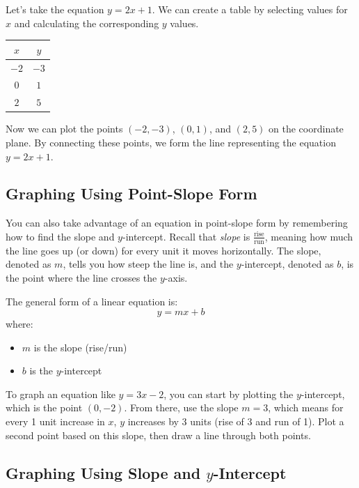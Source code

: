 \documentclass[12pt]{article}
\begin{document}
Let's take the equation \( y = 2x + 1 \). We can create a table by selecting
values for $x$ and calculating the corresponding $y$ values.

\begin{center}
  \begin{tabular}{cc}
    \hline
    $x$  & $y$  \\
    \hline
    $-2$ & $-3$ \\
    $0$  & $1$  \\
    $2$  & $5$  \\
    \hline
  \end{tabular}
\end{center}

Now we can plot the points $(-2, -3)$, $(0, 1)$, and $(2, 5)$ on the coordinate
plane. By connecting these points, we form the line representing the equation \(
y = 2x + 1 \).

\subsection{Graphing Using Point-Slope Form}

You can also take advantage of an equation in point-slope form by remembering
how to find the slope and $y$-intercept. Recall that \emph{slope} is
$\frac{\text{rise}}{\text{run}}$, meaning how much the line goes up (or down)
for every unit it moves horizontally. The slope, denoted as $m$, tells you how
steep the line is, and the $y$-intercept, denoted as $b$, is the point where the
line crosses the $y$-axis.

The general form of a linear equation is:
\[
  y = mx + b
\]
where:
\begin{itemize}
  \item $m$ is the slope (rise/run)
  \item $b$ is the $y$-intercept
\end{itemize}

To graph an equation like \( y = 3x - 2 \), you can start by plotting the
$y$-intercept, which is the point $(0, -2)$. From there, use the slope \( m = 3
\), which means for every 1 unit increase in $x$, $y$ increases by 3 units (rise
of 3 and run of 1). Plot a second point based on this slope, then draw a line
through both points.

\subsection{Graphing Using Slope and $y$-Intercept}
\end{document}
